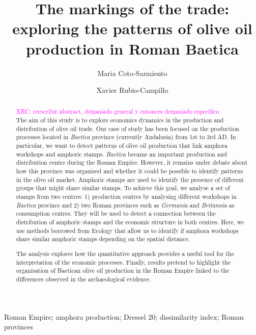 \documentclass[review]{elsarticle}
\newcommand{\memo}[2]{\textcolor{#1}{#2}}
\newcommand{\xavi}[1]{\memo{magenta}{XRC: #1\\}}
\begin{document}
\begin{frontmatter}

\title{The markings of the trade: exploring the patterns of olive oil production in Roman Baetica}

\author[ceipacadress]{Maria Coto-Sarmiento}


\author[edadress]{Xavier Rubio-Campillo}

\address[ceipacadress]{CEIPAC, Department of Prehistory and Archaeology, Montalegre, 6-8, 08001, University of Barcelona, Barcelona, Spain}
\address[edadress]{School of History, Classic \& Archaeology, Room OOM.33, William Robertson Wing, Old Medical School, Teviot Place, University of Edinburgh, UK}

\begin{keyword}
Roman Empire; amphora production; Dressel 20; dissimilarity index; Roman provinces
\end{keyword}


\begin{abstract}

\xavi{reescribir abstract, demasiado general y entonces demasiado específico}
The aim of this study is to explore economics dynamics in the production and distribution of olive oil trade. 
Our case of study has been focused on the production processes located in \textit{Baetica} province (currently Andalusia) from 1st to 3rd AD. In particular, we want to detect patterns of olive oil production that link amphora workshops and amphoric stamps. \textit{Baetica} became an important production and distribution centre during the Roman Empire. However, it remains under debate about how this province was organised and whether it could be possible to identify patterns in the olive oil market. Amphoric stamps are used to identify the presence of different groups that might share similar stamps. To achieve this goal, we analyse a set of stamps from two centres: 1) production centres by analysing different workshops in \textit{Baetica} province and 2) two Roman provinces such as \textit{Germania} and \textit{Britannia} as consumption centres. They will be used to detect a connection between the distribution of amphoric stamps and the economic structure in both centres. Here, we use methods borrowed from Ecology that allow us to identify if amphora workshops share similar amphoric stamps depending on the spatial distance. 

The analysis explores how the quantitative approach provides a useful tool for the interpretation of the economic processes. Finally, results pretend to highlight the organisation of Baetican olive oil production in the Roman Empire linked to the differences observed in the archaeological evidence.

\end{abstract}


\end{frontmatter}
\end{document}
